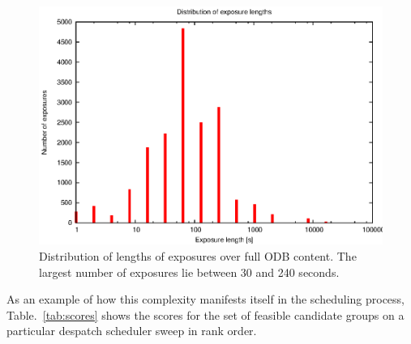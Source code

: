 {{\begin{figure}[htbp]
\begin{center}
    \includegraphics[scale=1.0, angle=0]{figures/ext.eps}
\end{center} 
\caption[Distribution of lengths of exposures over full ODB content.]
{Distribution of lengths of exposures over full ODB content. The largest number of exposures lie between 30 and 240 seconds.}
\label{fig:odb_extent}
\end{figure}

As an example of how this complexity manifests itself in the scheduling process, Table.~\ref{tab:scores} shows the scores for the set of feasible candidate groups on a particular despatch scheduler sweep in rank order.

}}
